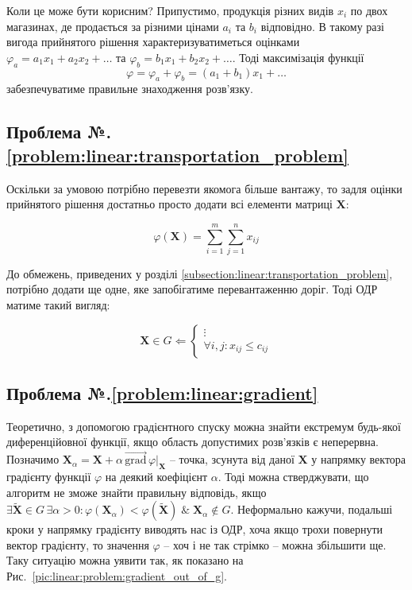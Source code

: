 \documentclass[\main/book.tex]{subfiles}
\begin{document}
Коли це може бути корисним? Припустимо, продукція різних видів $x_i$ по двох магазинах, де продається за різними цінами $a_i$ та $b_i$ відповідно. В такому разі \flqq{}вигода\frqq{} прийнятого рішення характеризуватиметься оцінками $\varphi_a = a_1 x_1 + a_2 x_2 + \ldots$ та $\varphi_b = b_1 x_1 + b_2 x_2 + \ldots$. Тоді максимізація функції $$\varphi = \varphi_a + \varphi_b = (a_1 + b_1) x_1 + \ldots$$ забезпечуватиме правильне знаходження розв'язку.

\subsection*{Проблема №.\ref{problem:linear:transportation_problem}}

Оскільки за умовою потрібно \flqq{}перевезти якомога більше вантажу\frqq{}, то задля оцінки прийнятого рішення достатньо просто додати всі елементи матриці $\mathbf{X}$:

\[
 \varphi(\mathbf{X}) = \sum_{i=1}^{m} \sum_{j=1}^{n} x_{ij}
\]

До обмежень, приведених у розділі \ref{subsection:linear:transportation_problem}, потрібно додати ще одне, яке запобігатиме перевантаженню доріг. Тоді ОДР матиме такий вигляд:

\[
 \mathbf{X} \in G \Leftarrow \left\{
  \begin{array}{l}
   \vdots \\
   \forall i, j: x_{ij} \leq c_{ij}
  \end{array}
 \right.
\]

\subsection*{Проблема №.\ref{problem:linear:gradient}}

Теоретично, з допомогою градієнтного спуску можна знайти екстремум будь-якої диференційовної функції, якщо область допустимих розв'язків є неперервна. Позначимо $\mathbf{X}_\alpha = \mathbf{X} + \alpha \, \overrightarrow{\textrm{grad}} \, \varphi \Bigr|_\mathbf{X}$ -- точка, зсунута від даної $\mathbf{X}$ у напрямку вектора градієнту функції $\varphi$ на деякий коефіцієнт $\alpha$. Тоді можна стверджувати, що алгоритм не зможе знайти правильну відповідь, якщо $\exists \widetilde{\mathbf{X}} \in G \, \exists \alpha > 0: \varphi(\mathbf{X}_\alpha) < \varphi(\widetilde{\mathbf{X}}) \;\&\; \mathbf{X}_\alpha \notin G$. Неформально кажучи, подальші кроки у напрямку градієнту виводять нас із ОДР, хоча якщо трохи повернути вектор градієнту, то значення $\varphi$ -- хоч і не так стрімко -- можна збільшити ще. Таку ситуацію можна уявити так, як показано на Рис.~\ref{pic:linear:problem:gradient_out_of_g}.
\end{document}
